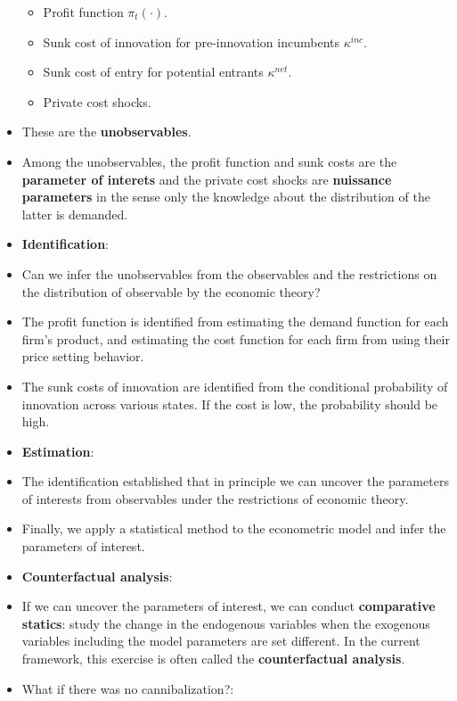 \documentclass[]{book}
\providecommand{\tightlist}{%
  \setlength{\itemsep}{0pt}\setlength{\parskip}{0pt}}
\begin{document}
\begin{itemize}
  \begin{itemize}
  \tightlist
  \item
    Profit function \(\pi_t(\cdot)\).
  \item
    Sunk cost of innovation for pre-innovation incumbents
    \(\kappa^{inc}\).
  \item
    Sunk cost of entry for potential entrants \(\kappa^{net}\).
  \item
    Private cost shocks.
  \end{itemize}
\item
  These are the \textbf{unobservables}.
\item
  Among the unobservables, the profit function and sunk costs are the
  \textbf{parameter of interets} and the private cost shocks are
  \textbf{nuissance parameters} in the sense only the knowledge about
  the distribution of the latter is demanded.
\item
  \textbf{Identification}:
\item
  Can we infer the unobservables from the observables and the
  restrictions on the distribution of observable by the economic theory?
\item
  The profit function is identified from estimating the demand function
  for each firm's product, and estimating the cost function for each
  firm from using their price setting behavior.
\item
  The sunk costs of innovation are identified from the conditional
  probability of innovation across various states. If the cost is low,
  the probability should be high.
\item
  \textbf{Estimation}:
\item
  The identification established that in principle we can uncover the
  parameters of interests from observables under the restrictions of
  economic theory.
\item
  Finally, we apply a statistical method to the econometric model and
  infer the parameters of interest.
\item
  \textbf{Counterfactual analysis}:
\item
  If we can uncover the parameters of interest, we can conduct
  \textbf{comparative statics}: study the change in the endogenous
  variables when the exogenous variables including the model parameters
  are set different. In the current framework, this exercise is often
  called the \textbf{counterfactual analysis}.
\item
  What if there was no cannibalization?:


\end{itemize}
\end{document}
